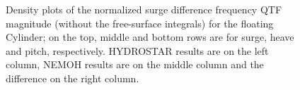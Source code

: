 \documentclass[12pt,a4paper,titlepage]{article}
\begin{document}
\begin{figure}[ht!]
	\centering
{}
	\caption{Density plots of the normalized surge difference frequency QTF magnitude (without the free-surface integrals) for the floating Cylinder; on the top, middle and bottom rows are for surge, heave and pitch, respectively. HYDROSTAR results are on the left column, NEMOH results are on the middle column and the difference on the right column.}\label{fig:QTFM_Cylinder}
\end{figure}
\end{document}
